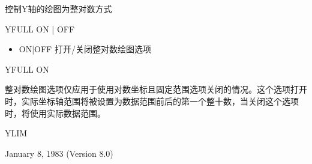 \label{cmd:yfull}

控制Y轴的绘图为整对数方式

YFULL ON | OFF

\begin{itemize}
\item ON|OFF 打开/关闭整对数绘图选项
\end{itemize}

YFULL ON

整对数绘图选项仅应用于使用对数坐标且固定范围选项关闭的情况。这个选项打开时，实际坐标轴范围将被设置为数据范围前后的第一个整十数，当关闭这个选项时，将使用实际数据范围。

YLIM

January 8, 1983 (Version 8.0)
